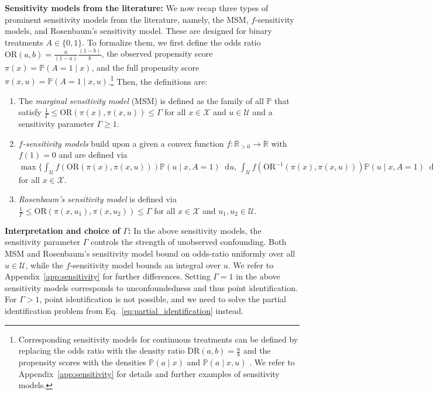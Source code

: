 \documentclass{article} %
\newcommand{\R}{\mathbb{R}}
\newcommand*\diff{\mathop{}\!\mathrm{d}}
\theoremstyle{definition}
\theoremstyle{plain}
\begin{document}
\textbf{Sensitivity models from the literature:} We now recap three types of prominent sensitivity models from the literature, namely, the MSM, $f$-sensitivity models, and Rosenbaum's sensitivity model. These are designed for binary treatments $A \in \{0, 1\}$. To formalize them, we first define the odds ratio $\mathrm{OR}(a, b) =  \frac{a}{(1 - a)} \frac{(1 - b)}{b}$, the observed propensity score $\pi(x) = \mathbb{P}(A=1 \mid x)$, and the full propensity score $\pi(x, u) = \mathbb{P}(A=1 \mid x, u)$.\footnote{Corresponding sensitivity models for continuous treatments can be defined by replacing the odds ratio with the density ratio $\mathrm{DR}(a, b) = \frac{a}{b}$ and the propensity scores with the densities $\mathbb{P}(a \mid x)$ and $\mathbb{P}(a \mid x, u)$ \citep{Bonvini.2022, Jesson.2022}. We refer to Appendix~\ref{app:sensitivity} for details and further examples of sensitivity models.} Then, the definitions are:
\begin{enumerate}[leftmargin=7.5mm]
    \item The \emph{marginal sensitivity model} (MSM) \citep{Tan.2006} is defined as the family of all $\mathbb{P}$ that satisfy
$\frac{1}{\Gamma} \leq \mathrm{OR}(\pi(x), \pi(x,u)) \leq \Gamma$ for all $x \in \mathcal{X}$ and $u \in \mathcal{U}$ and a sensitivity parameter $\Gamma \geq 1$.

\item \emph{$f$-sensitivity models} \citep{Jin.2022} build upon a given a convex function $f \colon \R_{>0} \to \R$ with $f(1) = 0$ and are defined via 
    $\max\big\{ \int_{\mathcal{U}} f\left(\mathrm{OR}(\pi(x), \pi(x,u))\right) \mathbb{P}(u \mid x, A=1) \diff u, \,  \int_{\mathcal{U}} f\left(\mathrm{OR}^{-1}(\pi(x), \pi(x,u))\right) \mathbb{P}(u \mid x, A=1) \diff u\big\} \leq \Gamma$
for all $x \in \mathcal{X}$.

\item \emph{Rosenbaum's sensitivity model} \citep{Rosenbaum.1987} is defined via $\frac{1}{\Gamma} \leq \mathrm{OR}(\pi(x, u_1), \pi(x,u_2)) \leq \Gamma$
for all $x \in \mathcal{X}$ and $u_1, u_2 \in \mathcal{U}$.
\end{enumerate}

\textbf{Interpretation and choice of $\Gamma$:} In the above sensitivity models, the sensitivity parameter $\Gamma$ controls the strength of unobserved confounding. Both MSM and Rosenbaum's sensitivity model bound on odds-ratio uniformly over all $u \in \mathcal{U}$, while the $f$-sensitivity model bounds an integral over $u$. We refer to Appendix~\ref{app:sensitivity} for further differences. Setting $\Gamma = 1$ in the above sensitivity models corresponds to unconfoundedness and thus point identification. For $\Gamma > 1$, point identification is not possible, and we need to solve the partial identification problem from Eq.~\eqref{eq:partial_identification} instead. 
\end{document}
